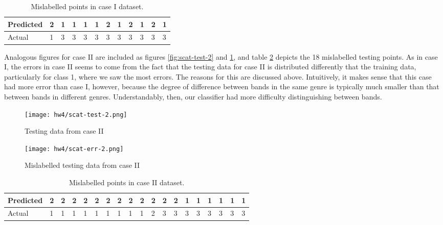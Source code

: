 \documentclass[a4paper,10 pt]{article}
\begin{document}
\begin{table}[]
\centering
\begin{tabular}{|l|l|l|l|l|l|l|l|l|l|l|l|}
\hline
Predicted & 2 & 1 & 1 & 1 & 1 & 2 & 1 & 2 & 1 & 2 & 1 \\ \hline
Actual & 1 & 3 & 3 & 3 & 3 & 3 & 3 & 3 & 3 & 3 & 3 \\ \hline
\end{tabular}
\caption{Mislabelled points in case I dataset.}
\label{tab:err-1}
\end{table}


Analogous figures for case II are included as figures \ref{fig:scat-test-2} and \ref{fig:scat-err-2}, and table \ref{tab:err-2} depicts the 18 mislabelled testing points. As in case I, the errors in case II seems to come from the fact that the testing data for case II is distributed differently that the training data, particularly for class 1, where we saw the most errors. The reasons for this are discussed above. Intuitively, it makes sense that this case had more error than case I, however, because the degree of difference between bands in the same genre is typically much smaller than that between bands in different genres. Understandably, then, our classifier had more difficulty distinguishing between bands.

\begin{figure}
    \centering
    \begin{minipage}{0.45\textwidth}
        \centering
        \texttt{[image: hw4/scat-test-2.png]} %
        \caption{Testing data from case II}
        \label{fig:scat-test-2}
    \end{minipage}\hfill
    \begin{minipage}{0.45\textwidth}
        \centering
        \texttt{[image: hw4/scat-err-2.png]} %
        \caption{Mislabelled testing data from case II}
        \label{fig:scat-err-2}
    \end{minipage}
\end{figure}

\begin{table}[]
\centering
\begin{tabular}{|l|l|l|l|l|l|l|l|l|l|l|l|l|l|l|l|l|l|l|}
\hline
Predicted & 2 & 2 & 2 & 2 & 2 & 2 & 2 & 2 & 2 & 2 & 2 & 2 & 1 & 1 & 1 & 1 & 1 & 1 \\ \hline
Actual & 1 & 1 & 1 & 1 & 1 & 1 & 1 & 1 & 1 & 2 & 3 & 3 & 3 & 3 & 3 & 3 & 3 & 3 \\ \hline
\end{tabular}
\caption{Mislabelled points in case II dataset.}
\label{tab:err-2}
\end{table}
\end{document}

